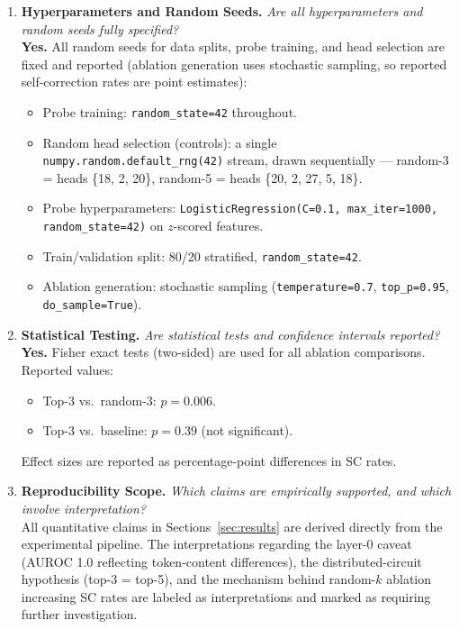 \begin{enumerate}
\item \textbf{Hyperparameters and Random Seeds.}
\textit{Are all hyperparameters and random seeds fully specified?} \\
\textbf{Yes.} All random seeds for data splits, probe training, and head selection are fixed and reported (ablation generation uses stochastic sampling, so reported self-correction rates are point estimates):
\begin{itemize}
  \item Probe training: \texttt{random\_state=42} throughout.
  \item Random head selection (controls): a single \texttt{numpy.random.default\_rng(42)} stream, drawn sequentially --- random-3 = heads \{18, 2, 20\}, random-5 = heads \{20, 2, 27, 5, 18\}.
  \item Probe hyperparameters: \texttt{LogisticRegression(C=0.1, max\_iter=1000, random\_state=42)} on $z$-scored features.
  \item Train/validation split: 80/20 stratified, \texttt{random\_state=42}.
  \item Ablation generation: stochastic sampling (\texttt{temperature=0.7}, \texttt{top\_p=0.95}, \texttt{do\_sample=True}).
\end{itemize}

\item \textbf{Statistical Testing.}
\textit{Are statistical tests and confidence intervals reported?} \\
\textbf{Yes.} Fisher exact tests (two-sided) are used for all ablation comparisons. Reported values:
\begin{itemize}
  \item Top-3 vs.\ random-3: $p = 0.006$.
  \item Top-3 vs.\ baseline: $p = 0.39$ (not significant).
\end{itemize}
Effect sizes are reported as percentage-point differences in SC rates.

\item \textbf{Reproducibility Scope.}
\textit{Which claims are empirically supported, and which involve interpretation?} \\
All quantitative claims in Sections~\ref{sec:results} are derived directly from the experimental pipeline. The interpretations regarding the layer-0 caveat (AUROC 1.0 reflecting token-content differences), the distributed-circuit hypothesis (top-3 = top-5), and the mechanism behind random-$k$ ablation increasing SC rates are labeled as interpretations and marked as requiring further investigation.

\end{enumerate}

